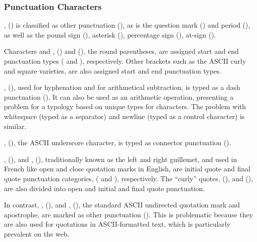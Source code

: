 \subsubsection{Punctuation Characters}

,  (\charmention{!}) is
classified as other punctuation (), as is the question mark
()  and period (), as well as the pound
sign (\charmention{\#}), asterisk (\charmention{*}), percentage sign
(\charmention{\%}), at-sign ().

Characters  and ,  (\charmention{(}) and 
(\charmention{)}), the round parentheses, are assigned start and end
punctuation types ( and ), respectively.  Other
brackets such as the ASCII curly and square varieties, are also
assigned start and end punctuation types.

,  (\charmention{-}), used for
hyphenation and for arithmetical subtraction, is typed as a dash
punctuation ().  It can also be used as an arithmetic
operation, presenting a problem for a typology based on unique types
for characters. The problem with whitespace (typed as a separator) and
newline (typed as a control character) is similar.

,  (\charmention{\_}), the ASCII
underscore character, is typed as connector punctuation ().

,  (\charmention{<<}), and ,
(\charmention{>>}), traditionally known as the left and right
guillemet, and used in French like open and close quotation marks in
English, are initial quote and final quote punctuation categories,
( and ), respectively.  The ``curly'' quotes,
 (), and 
(), are also divided into open and initial and final
quote punctuation.

In contrast, , 
(), and , 
(), the standard ASCII undirected quotation mark and
apostrophe, are marked as other punctuation ().  This
is problematic because they are also used for quotations in
ASCII-formatted text, which is particularly prevalent on the web.

